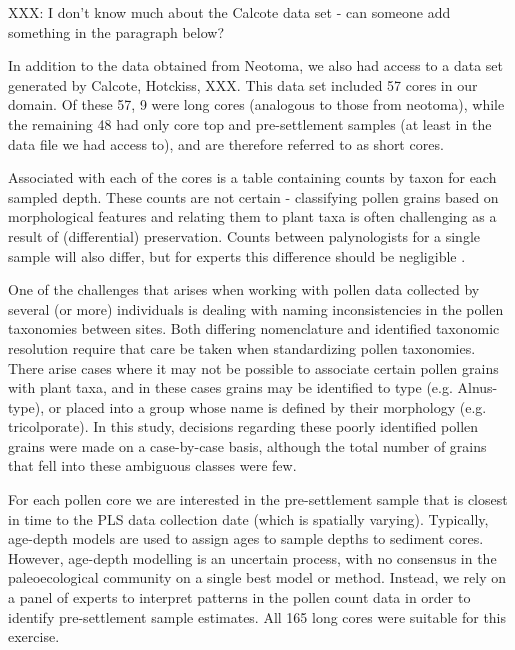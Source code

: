 \documentclass[12pt]{article}
\begin{document}
XXX: I don't know much about the Calcote data set - can someone add something in the paragraph below?

In addition to the data obtained from Neotoma, we also had access to a
data set generated by Calcote, Hotckiss, XXX. This data set included
57 cores in our domain. Of these 57, 9 were long cores (analogous to
those from neotoma), while the remaining 48 had only core top and
pre-settlement samples (at least in the data file we had access to),
and are therefore referred to as short cores.

Associated with each of the cores is a table containing counts by
taxon for each sampled depth. These counts are not certain -
classifying pollen grains based on morphological features and relating
them to plant taxa is often challenging as a result of (differential)
preservation. Counts between palynologists for a single sample will
also differ, but for experts this difference should be negligible
\cite{XXX}.

One of the challenges that arises when working with pollen data
collected by several (or more) individuals is dealing with naming
inconsistencies in the pollen taxonomies between sites. Both differing
nomenclature and identified taxonomic resolution require that care be
taken when standardizing pollen taxonomies. There arise cases where it
may not be possible to associate certain pollen grains with plant
taxa, and in these cases grains may be identified to type
(e.g. Alnus-type), or placed into a group whose name is defined by
their morphology (e.g. tricolporate). In this study, decisions
regarding these poorly identified pollen grains were made on a
case-by-case basis, although the total number of grains that fell into
these ambiguous classes were few.

For each pollen core we are interested in the pre-settlement sample
that is closest in time to the PLS data collection date (which is
spatially varying). Typically, age-depth models are used to assign
ages to sample depths to sediment cores. However, age-depth modelling
is an uncertain process, with no consensus in the paleoecological
community on a single best model or method. Instead, we rely on a
panel of experts to interpret patterns in the pollen count data in
order to identify pre-settlement sample estimates. All 165 long cores were
suitable for this exercise.
\end{document}
